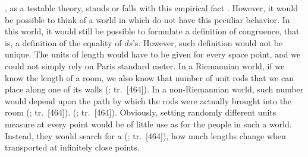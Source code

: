 \documentclass[submitted]{article}
\renewcommand{\rzlap}[2]{(\cite[#1]{Reichenbach1928}; tr.\ [#2])\xspace}
\begin{document}
\Gr, as a testable theory, stands or falls with this empirical fact . However, it would be possible to think of a world in which \rac do not have this peculiar  behavior. In this world, it would still be possible to formulate a definition of congruence, that is, a definition of the equality of $ds$'s. However, such definition would not be unique. The units of length would have to be given for every space point, and we could not simply rely on Paris standard meter. In a Riemannian world, if we know the length of a room, we also know that number of unit rods that we can place along one of its walls \rzlap{333}{464}. In a non-Riemannian world, such number would depend upon the path by which the rods were actually brought into the room \rzlap{333}{464}.  \rzlap{333}{464}. Obviously, setting randomly different units measure at every point would be of little use as for the people in such a world. Instead, they would search for a  \rzlap{333}{464}, how much lengths change when transported at infinitely close points.

\end{document}
